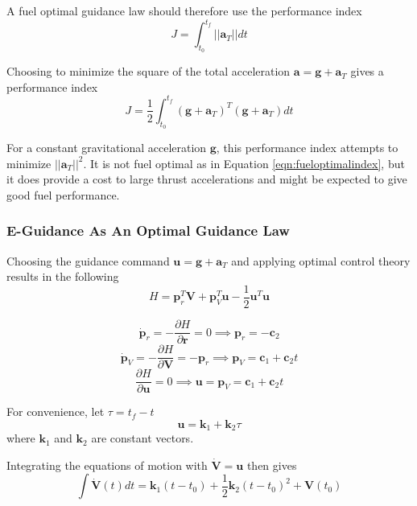 A fuel optimal guidance law should therefore use the performance index
\begin{equation}
\label{eqn:fueloptimalindex}
J = \int_{t_0}^{t_f} ||\bm{a}_T||dt
\end{equation}

Choosing to minimize the square of the total acceleration $\bm{a} = \bm{g} + \bm{a}_T$ gives a performance index
\begin{equation}
\label{eqn:performanceindex}
J = \frac{1}{2} \int_{t_0}^{t_f} (\bm{g}+\bm{a}_T)^T(\bm{g}+\bm{a}_T)dt
\end{equation}

For a constant gravitational acceleration $\bm{g}$, this performance index attempts to minimize $||\bm{a}_T||^2$. It is not fuel optimal as in Equation \ref{eqn:fueloptimalindex}, but it does provide a cost to large thrust accelerations and might be expected to give good fuel performance.

\subsubsection{E-Guidance As An Optimal Guidance Law}
Choosing the guidance command $\bm{u} = \bm{g} + \bm{a}_T$ and applying optimal control theory results in the following
\begin{equation}
\label{eqn:Hamiltonian}
H = \bm{p}_r^T\bm{V} + \bm{p}_V^T\bm{u} - \frac{1}{2}\bm{u}^T\bm{u}
\end{equation}

\begin{equation*}
\dot{\bm{p}}_r = -\frac{\partial H}{\partial \bm{r}} = 0 \implies \bm{p}_r = -\bm{c}_2
\end{equation*}
\begin{equation*}
\dot{\bm{p}}_V = -\frac{\partial H}{\partial \bm{V}} = -\bm{p}_r \implies \bm{p}_V = \bm{c}_1 + \bm{c}_2 t
\end{equation*}
\begin{equation*}
\frac{\partial H}{\partial \bm{u}} = 0 \implies \bm{u} = \bm{p}_V = \bm{c}_1 + \bm{c}_2 t
\end{equation*}

For convenience, let $\tau = t_f - t$
\begin{equation}
\label{eqn:command}
\bm{u} = \bm{k}_1 + \bm{k}_2 \tau
\end{equation}
where $\bm{k}_1$ and $\bm{k}_2$ are constant vectors.

Integrating the equations of motion with $\bm{\dot{V}} = \bm{u}$ then gives
\begin{equation}
\label{eqn:EoM_solve_1}
\int\bm{\dot{V}}(t) dt  = \bm{k}_1(t-t_0) + \frac{1}{2}\bm{k}_2(t-t_0)^2 + \bm{V}(t_0) 
\end{equation}

